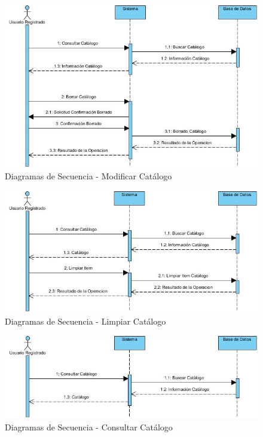 \documentclass[a4paper,11pt]{book}
\begin{document}
\begin{figure}[H] 
\centering 
\includegraphics[scale=0.50]{imagenes/secuencia/Borrar_Catalogo.jpg}
\caption{ Diagramas de Secuencia - Modificar Catálogo\cite{diagrama}  }  
\end{figure}

\begin{figure}[H] 
\centering 
\includegraphics[scale=0.50]{imagenes/secuencia/Limpiar_Items_Catalogo.jpg}
\caption{ Diagramas de Secuencia - Limpiar Catálogo\cite{diagrama}  }  
\end{figure}

\begin{figure}[H] 
\centering 
\includegraphics[scale=0.50]{imagenes/secuencia/Consultar_Catalogo.jpg}
\caption{ Diagramas de Secuencia - Consultar Catálogo\cite{diagrama}  }  
\end{figure}
\end{document}
